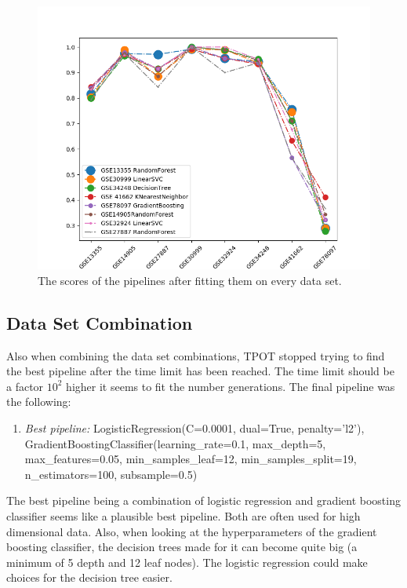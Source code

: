 \documentclass[10pt,a4paper]{article}
\begin{document}
	\begin{figure}[h!]
		\includegraphics[scale=0.6]{DataPipelineScores.png}
		\caption{The scores of the pipelines after fitting them on every data set.}
		\label{fig:DataPipelineScores}
	\end{figure}

	\subsection{Data Set Combination}
	\label{subsec:ResultsDataSetCombination}
	
	Also when combining the data set combinations, TPOT stopped trying to find the best pipeline after the time limit has been reached. The time limit should be a factor $10^2$ higher it seems to fit the number generations. The final pipeline was the following:
	
	\begin{enumerate}
		\item[] \textit{Best pipeline:}  LogisticRegression(C=0.0001, dual=True, penalty='l2'),
		GradientBoostingClassifier(learning\_rate=0.1, max\_depth=5, max\_features=0.05,
		min\_samples\_leaf=12,
		min\_samples\_split=19, n\_estimators=100, subsample=0.5)
		
	\end{enumerate}

	The best pipeline being a combination of logistic regression and gradient boosting classifier seems like a plausible best pipeline. Both are often used for high dimensional data. Also, when looking at the hyperparameters of the gradient boosting classifier, the decision trees made for it can become quite big (a minimum of 5 depth and 12 leaf nodes). The logistic regression could make choices for the decision tree easier.
	
\end{document}
